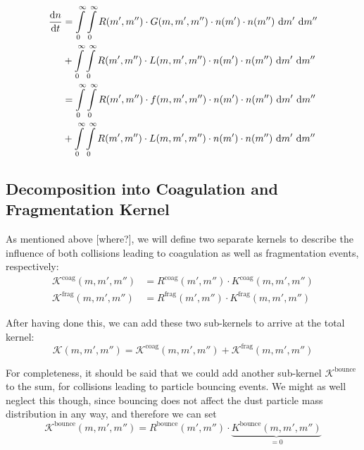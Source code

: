         \begin{align}
            \frac{\text{d} n}{\text{d} t}
            &=\int\limits_0^\infty \int\limits_0^\infty R(m',m'') \cdot G(m,m',m'')
                \cdot n(m') \cdot n(m'') \ \text dm' \ \text dm'' \\
            &+\int\limits_0^\infty \int\limits_0^\infty R(m',m'') \cdot L(m,m',m'')
                \cdot n(m') \cdot n(m'') \ \text dm' \ \text dm'' \\
            &=\int\limits_0^\infty \int\limits_0^\infty R(m',m'') \cdot f(m,m',m'')
                \cdot n(m') \cdot n(m'') \ \text dm' \ \text dm'' \\
            &+\int\limits_0^\infty \int\limits_0^\infty R(m',m'') \cdot L(m,m',m'')
                \cdot n(m') \cdot n(m'') \ \text dm' \ \text dm'' 
        \end{align}

    \clearpage\subsection{Decomposition into Coagulation and Fragmentation Kernel}

        As mentioned above [where?], we will define two separate kernels to describe the influence 
        of both collisions leading to coagulation as well as fragmentation events, respectively:
        \begin{align}
            \mathcal K^\text{coag}(m,m',m'') &= R^\text{coag}(m',m'') \cdot K^\text{coag}(m,m',m'') \\
            \mathcal K^\text{frag}(m,m',m'') &= R^\text{frag}(m',m'') \cdot K^\text{frag}(m,m',m'')
        \end{align}

        After having done this, we can add these two sub-kernels to arrive at the total kernel:
        \begin{equation}
            \mathcal K(m,m',m'') = \mathcal K^\text{coag}(m,m',m'') + \mathcal K^\text{frag}(m,m',m'')
        \end{equation}

        For completeness, it should be said that we could add another sub-kernel 
        $\mathcal K^\text{bounce}$ to the sum, for collisions leading to particle bouncing events.
        We might as well neglect this though, since bouncing does not affect the dust particle mass 
        distribution in any way, and therefore we can set
        \begin{equation}
            \mathcal K^\text{bounce}(m,m',m'') 
            = R^\text{bounce}(m',m'') \cdot \underbrace{K^\text{bounce}(m,m',m'')}_{=0}
        \end{equation}

